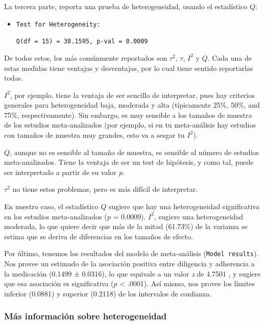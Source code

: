 \documentclass[
]{article}
\begin{document}
La tercera parte, reporta una prueba de heterogeneidad, usando el
estadístico \(Q\):

\begin{itemize}
\item
  \texttt{Test\ for\ Heterogeneity:}

  \texttt{Q(df\ =\ 15)\ =\ 38.1595,\ p-val\ =\ 0.0009}
\end{itemize}

De todos estos, los más comúnmente reportados son \(\tau^2\), \(\tau\),
\(I^2\) y \(Q\). Cada una de estas medidas tiene ventajas y desventajas,
por lo cual tiene sentido reportarlas todas.

\(I^2\), por ejemplo, tiene la ventaja de ser sencillo de interpretar,
pues hay criterios generales para heterogeneidad baja, moderada y alta
(típicamente 25\%, 50\%, and 75\%, respectivamente). Sin embargo, es muy
sensible a los tamaños de muestra de los estudios meta-analizados (por
ejemplo, si en tu meta-análisis hay estudios con tamaños de muestra muy
grandes, esto va a sesgar tu \(I^2\)).

\(Q\), aunque no es sensible al tamaño de muestra, es sensible al número
de estudios meta-analizados. Tiene la ventaja de ser un test de
hipótesis, y como tal, puede ser interpretado a partir de su valor
\emph{p}.

\(\tau^2\) no tiene estos problemas, pero es más difícil de interpretar.

En nuestro caso, el estadístico \(Q\) sugiere que hay una heterogeneidad
significativa en los estudios meta-analizados (\(p\) = 0.0009). \(I^2\),
sugiere una heterogeneidad moderada, lo que quiere decir que más de la
mitad (61.73\%) de la varianza se estima que se deriva de diferencias en
los tamaños de efecto.

Por último, tenemos los resultados del modelo de meta-análisis
(\texttt{Model\ results}). Nos provee un estimado de la asociación
positiva entre diligencia y adherencia a la medicación (0.1499 ±
0.0316), lo que equivale a un valor \emph{z} de 4.7501 , y sugiere que
esa asociación es significativa (\(p\) \textless{} .0001). Así mismo,
nos provee los límites inferior (0.0881) y superior (0.2118) de los
intervalos de confianza.

\hypertarget{muxe1s-informaciuxf3n-sobre-heterogeneidad}{%
\subsubsection{Más información sobre
heterogeneidad}\label{muxe1s-informaciuxf3n-sobre-heterogeneidad}}
\end{document}
